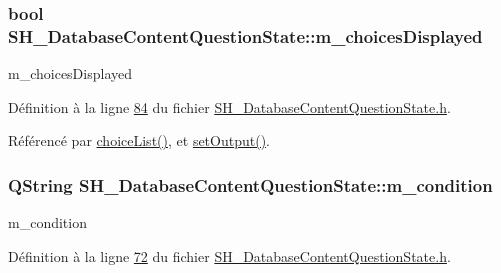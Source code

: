 \hypertarget{classSH__DatabaseContentQuestionState_aff4d8f402d9299029038ec4f21271b2b}{
\subsubsection[{m\-\_\-choices\-Displayed}]{\setlength{\rightskip}{0pt plus 5cm}bool S\-H\-\_\-\-Database\-Content\-Question\-State\-::m\-\_\-choices\-Displayed\hspace{0.3cm}{\ttfamily [private]}}}\label{classSH__DatabaseContentQuestionState_aff4d8f402d9299029038ec4f21271b2b}


m\-\_\-choices\-Displayed 



Définition à la ligne \hyperlink{SH__DatabaseContentQuestionState_8h_source_l00084}{84} du fichier \hyperlink{SH__DatabaseContentQuestionState_8h_source}{S\-H\-\_\-\-Database\-Content\-Question\-State.\-h}.



Référencé par \hyperlink{classSH__DatabaseContentQuestionState_a15092c0fa6188ce6c4427d2ec9751055}{choice\-List()}, et \hyperlink{classSH__DatabaseContentQuestionState_aff932cdd7974baeea9a477cf0abc5ace}{set\-Output()}.

\hypertarget{classSH__DatabaseContentQuestionState_aaffd467fccc69b6d46194f04831a1edc}{
\subsubsection[{m\-\_\-condition}]{\setlength{\rightskip}{0pt plus 5cm}Q\-String S\-H\-\_\-\-Database\-Content\-Question\-State\-::m\-\_\-condition\hspace{0.3cm}{\ttfamily [private]}}}\label{classSH__DatabaseContentQuestionState_aaffd467fccc69b6d46194f04831a1edc}


m\-\_\-condition 



Définition à la ligne \hyperlink{SH__DatabaseContentQuestionState_8h_source_l00072}{72} du fichier \hyperlink{SH__DatabaseContentQuestionState_8h_source}{S\-H\-\_\-\-Database\-Content\-Question\-State.\-h}.



